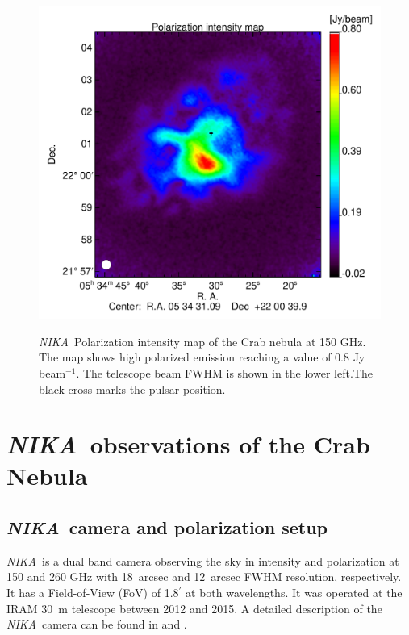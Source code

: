 \documentclass[twocolumn,traditabstract]{aa}
\def\NIKA{\textit{NIKA}}
\begin{document}
 \begin{figure}
  \centering
      {\includegraphics[width=0.75\linewidth,keepaspectratio]{figures/Crab_ipol2_2mm.pdf}}
\caption{\NIKA\ Polarization intensity map of the  Crab nebula at 150 GHz. The map shows high polarized emission reaching a value of 0.8 Jy beam$^{-1}$. The telescope beam FWHM is shown in the lower left.The black cross-marks the pulsar position.}
\label{crab_ipol_maps}		
  \end{figure}
 

\section{\NIKA\ observations of the Crab Nebula}\label{sec:NIKA observations}
\subsection{\NIKA\ camera and polarization setup}\label{sec:nika camera}
\NIKA\ is a dual band camera observing the sky in intensity and polarization at
150 and 260 GHz with 18~arcsec and 12~arcsec FWHM resolution, respectively. It
has a Field-of-View (FoV) of 1.8$^{\prime}$ at both wavelengths. It was operated at the
IRAM 30~m telescope between 2012 and 2015. A detailed description of the
\NIKA\ camera can be found in \citet{monfardini2010, monfardini2011} and
\citet{catalano2014}.
\end{document}
